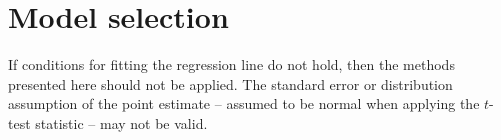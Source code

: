 \chapter{Model selection}
\label{linRegrForTwoVar}



\begin{tipBox}{
If conditions for fitting the regression line do not hold, then the methods presented here should not be applied. The standard error or distribution assumption of the point estimate -- assumed to be normal when applying the $t$-test statistic -- may not be valid.}
\end{tipBox}



